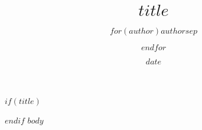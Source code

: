 \documentclass[
  fontsize=11pt,
  paper=landscape,
  twocolumn=true,
  pagesize=pdftex,
  DIV=15,
  ]{scrartcl}
\title{$title$}
\author{$for(author)$$author$$sep$ \and $endfor$}
\date{$date$}
\begin{document}
$if(title)$
\maketitle
$endif$
$body$
\end{document}
